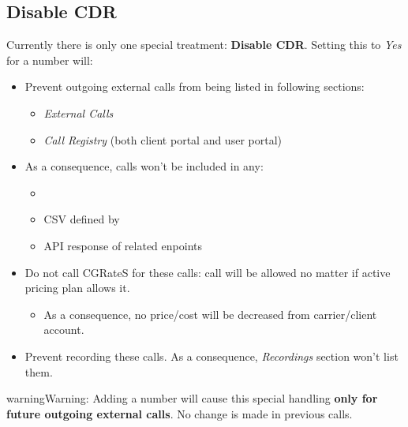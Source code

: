 \documentclass[letterpaper,10pt,english]{sphinxmanual}
\begin{document}
\subsection{Disable CDR}
\label{administration_portal/platform/global_special_numbers:disable-cdr}
Currently there is only one special treatment: \textbf{Disable CDR}. Setting this to \emph{Yes} for a number will:
\begin{itemize}
\item {} 
Prevent outgoing external calls from being listed in following sections:
\begin{itemize}
\item {} 
\emph{External Calls}

\item {} 
\emph{Call Registry} (both client portal and user portal)

\end{itemize}

\item {} 
As a consequence, calls won't be included in any:
\begin{itemize}
\item {} 
{\hyperref[administration_portal/brand/invoicing/invoices:invoices]{}}

\item {} 
CSV defined by {\hyperref[administration_portal/client/wholesale/calls/call_csv_schedulers:call\string-csv\string-schedulers]{}}

\item {} 
API response of related enpoints

\end{itemize}

\item {} 
Do not call CGRateS for these calls: call will be allowed no matter if active pricing plan allows it.
\begin{itemize}
\item {} 
As a consequence, no price/cost will be decreased from carrier/client account.

\end{itemize}

\item {} 
Prevent recording these calls. As a consequence, \emph{Recordings} section won't list them.

\end{itemize}

\begin{notice}{warning}{Warning:}
Adding a number will cause this special handling \textbf{only for future outgoing external calls}.
No change is made in previous calls.
\end{notice}
\end{document}
